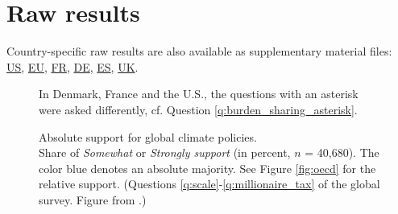 \clearpage
\section{Raw results%
}\label{app:raw_results}

Country-specific raw results are also available as supplementary material files:  \href{https://github.com/bixiou/global_tax_attitudes/raw/main/paper/app_desc_stats_US.pdf}{US}, \href{https://github.com/bixiou/global_tax_attitudes/raw/main/paper/app_desc_stats_EU.pdf}{EU}, \href{https://github.com/bixiou/global_tax_attitudes/raw/main/paper/app_desc_stats_FR.pdf}{FR}, \href{https://github.com/bixiou/global_tax_attitudes/raw/main/paper/app_desc_stats_DE.pdf}{DE}, \href{https://github.com/bixiou/global_tax_attitudes/raw/main/paper/app_desc_stats_ES.pdf}{ES}, \href{https://github.com/bixiou/global_tax_attitudes/raw/main/paper/app_desc_stats_UK.pdf}{UK}.

\begin{figure}[h!]
    \caption[Absolute support for global climate policies]{Absolute support for global climate policies. \\ Share of \textit{Somewhat} or \textit{Strongly support} (in percent, $n$ = 40,680). The color blue denotes an absolute majority. See Figure \ref{fig:oecd} for the relative support. (Questions \ref{q:scale}-\ref{q:millionaire_tax} of the global survey. Figure from \citealp{dechezlepretre_fighting_2022}.)} 
    \label{fig:oecd_absolute}%
    {\footnotesize *In Denmark, France and the U.S., the questions with an asterisk were asked differently, cf. Question \ref{q:burden_sharing_asterisk}. } 
\end{figure}

